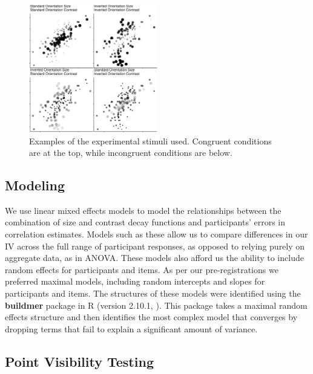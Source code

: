 \documentclass[manuscript, review, anonymous, screen]{acmart}
\begin{document}
\begin{figure}

\includegraphics[width=0.5\textwidth,height=\textheight]{size_and_contrast_files/figure-pdf/fig-examples-1.pdf} \hfill{}

\caption{\label{fig-examples}Examples of the experimental stimuli used.
Congruent conditions are at the top, while incongruent conditions are
below.}

\end{figure}

\hypertarget{sec-gen-modelling}{%
\subsection{Modeling}\label{sec-gen-modelling}}

We use linear mixed effects models to model the relationships between
the combination of size and contrast decay functions and participants'
errors in correlation estimates. Models such as these allow us to
compare differences in our IV across the full range of participant
responses, as opposed to relying purely on aggregate data, as in ANOVA.
These models also afford us the ability to include random effects for
participants and items. As per our pre-registrations we preferred
maximal models, including random intercepts and slopes for participants
and items. The structures of these models were identified using the
\textbf{buildmer} package in R (version 2.10.1,
\citep{voeten_buildmer}). This package takes a maximal random effects
structure and then identifies the most complex model that converges by
dropping terms that fail to explain a significant amount of variance.

\hypertarget{sec-VT}{%
\subsection{Point Visibility Testing}\label{sec-VT}}
\end{document}
